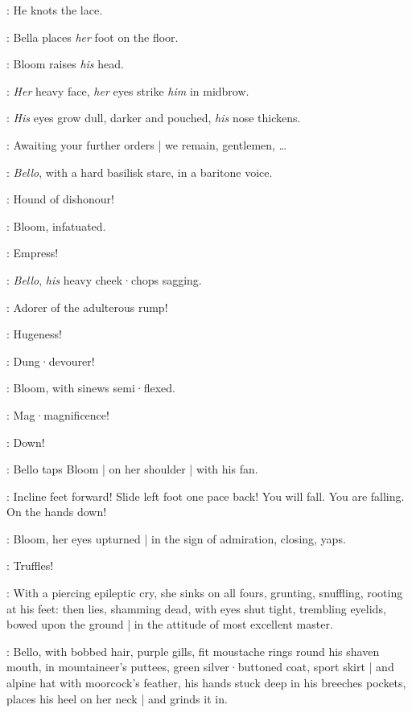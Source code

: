 :
He knots the lace.


:
Bella places \emph{her} foot on the floor.

:
Bloom raises \emph{his} head.

:
\emph{Her} heavy face,
\emph{her} eyes strike \emph{him} in midbrow.

:
\emph{His} eyes grow dull,
darker and pouched,
\emph{his} nose thickens.

\Bloom:
Awaiting your further orders |
we remain,
gentlemen,
…

:
\emph{Bello},
with a hard basilisk stare,
in a baritone voice.

\Bello:
Hound of dishonour!

:
Bloom,
infatuated.

\Bloom:
Empress!

:
\emph{Bello},
\emph{his} heavy cheek·chops sagging.

\Bello:
Adorer of the adulterous rump!

\Bloom:
Hugeness!

\Bello:
Dung·devourer!

:
Bloom,
with sinews semi·flexed.

\Bloom:
Mag·magnificence!

\Bello:
Down!

:
Bello taps Bloom |
on her shoulder |
with his fan.

\Bello:
Incline feet forward!
Slide left foot one pace back!
You will fall.
You are falling.
On the hands down!

:
Bloom,
her eyes upturned |
in the sign of admiration,
closing,
yaps.

\Bloom:
Truffles!

:
With a piercing epileptic cry,
she sinks on all fours,
grunting,
snuffling,
rooting at his feet:
then lies,
shamming dead,
with eyes shut tight,
trembling eyelids,
bowed upon the ground |
in the attitude of most excellent master.

:
Bello,
with bobbed hair,
purple gills,
fit moustache rings round his shaven mouth,
in mountaineer's puttees,
green silver·buttoned coat,
sport skirt |
and alpine hat with moorcock's feather,
his hands stuck deep in his breeches pockets,
places his heel on her neck |
and grinds it in.

